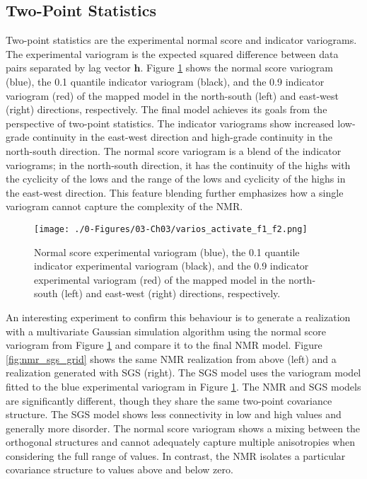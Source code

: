 \subsection{Two-Point Statistics}
\label{subsec:03twopt}

Two-point statistics are the experimental normal score and indicator variograms. The experimental variogram is the expected squared difference between data pairs separated by lag vector $\mathbf{h}$. Figure \ref{fig:varios_activate_f1_f2} shows the normal score variogram (blue), the 0.1 quantile indicator variogram (black), and the 0.9 indicator variogram (red) of the mapped model in the north-south (left) and east-west (right) directions, respectively. The final model achieves its goals from the perspective of two-point statistics. The indicator variograms show increased low-grade continuity in the east-west direction and high-grade continuity in the north-south direction. The normal score variogram is a blend of the indicator variograms; in the north-south direction, it has the continuity of the highs with the cyclicity of the lows and the range of the lows and cyclicity of the highs in the east-west direction. This feature blending further emphasizes how a single variogram cannot capture the complexity of the \gls{NMR}.

\begin{figure}[htb!]
    \centering
    \texttt{[image: ./0-Figures/03-Ch03/varios\_activate\_f1\_f2.png]}
    \caption{Normal score experimental variogram (blue), the 0.1 quantile indicator experimental variogram (black), and the 0.9 indicator experimental variogram (red) of the mapped model in the north-south (left) and east-west (right) directions, respectively.}
    \label{fig:varios_activate_f1_f2}
\end{figure}

An interesting experiment to confirm this behaviour is to generate a realization with a multivariate Gaussian simulation algorithm using the normal score variogram from Figure \ref{fig:varios_activate_f1_f2} and compare it to the final \gls{NMR} model. Figure \ref{fig:nmr_sgs_grid} shows the same \gls{NMR} realization from above (left) and a realization generated with \gls{SGS} (right). The \gls{SGS} model uses the variogram model fitted to the blue experimental variogram in Figure \ref{fig:varios_activate_f1_f2}. The \gls{NMR} and \gls{SGS} models are significantly different, though they share the same two-point covariance structure. The \gls{SGS} model shows less connectivity in low and high values and generally more disorder. The normal score variogram shows a mixing between the orthogonal structures and cannot adequately capture multiple anisotropies when considering the full range of values. In contrast, the \gls{NMR} isolates a particular covariance structure to values above and below zero.


